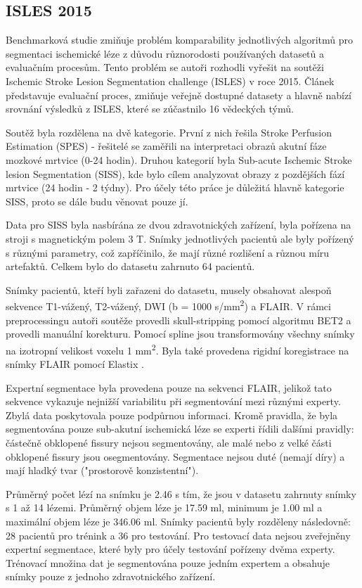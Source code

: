 \documentclass[11pt]{article}
\begin{document}
\subsection{ISLES 2015}
\label{lbl-isles15}
Benchmarková studie \cite{Maier2016} zmiňuje problém komparability jednotlivých algoritmů pro segmentaci ischemické léze z důvodu různorodosti používaných datasetů a evaluačním procesům. Tento problém se autoři rozhodli vyřešit na soutěži Ischemic Stroke Lesion Segmentation challenge (ISLES) v roce 2015. Článek představuje evaluační proces, zmiňuje veřejně dostupné datasety a hlavně nabízí srovnání výsledků z ISLES, které se zúčastnilo 16 vědeckých týmů.

Soutěž byla rozdělena na dvě kategorie. První z nich řešila Stroke Perfusion Estimation (SPES) - řešitelé se zaměřili na interpretaci obrazů akutní fáze mozkové mrtvice (0-24 hodin). Druhou kategorií byla Sub-acute Ischemic Stroke lesion Segmentation (SISS), kde bylo cílem analyzovat obrazy z pozdějších fází mrtvice (24 hodin - 2 týdny). Pro účely této práce je důležitá hlavně kategorie SISS, proto se dále budu věnovat pouze jí.

Data pro SISS byla nasbírána ze dvou zdravotnických zařízení, byla pořízena na stroji s magnetickým polem 3 T. Snímky jednotlivých pacientů ale byly pořízený s různými parametry, což zapříčinilo, že mají různé rozlišení a různou míru artefaktů. Celkem bylo do datasetu zahrnuto 64 pacientů.

Snímky pacientů, kteří byli zařazeni do datasetu, musely obsahovat alespoň sekvence T1-vážený, T2-vážený, DWI (b = 1000 s/mm\textsuperscript{2}) a FLAIR. V rámci preprocessingu autoři soutěže provedli skull-stripping pomocí algoritmu BET2 \cite{jenkinson2005bet2} a provedli manuální korekturu. Pomocí spline jsou transformovány všechny snímky na izotropní velikost voxelu 1 mm\textsuperscript{2}. Byla také provedena rigidní koregistrace na snímky FLAIR pomocí Elastix \cite{elastix}.

Expertní segmentace byla provedena pouze na sekvenci FLAIR, jelikož tato sekvence vykazuje nejnižší variabilitu při segmentování mezi různými experty. Zbylá data poskytovala pouze podpůrnou informaci. Kromě pravidla, že byla segmentována pouze sub-akutní ischemická léze se experti řídili dalšími pravidly: částečně obklopené fissury nejsou segmentovány, ale malé nebo z velké části obklopené fissury jsou osegmentovány. Segmentace nejsou duté (nemají díry) a mají hladký tvar ("prostorově konzistentní").

Průměrný počet lézí na snímku je 2.46 s tím, že jsou v datasetu zahrnuty snímky s 1 až 14 lézemi. Průměrný objem léze je 17.59 ml, minimum je 1.00 ml a maximální objem léze je 346.06 ml. Snímky pacientů byly rozděleny následovně: 28 pacientů pro trénink a 36 pro testování. Pro testovací data nejsou zveřejněny expertní segmentace, které byly pro účely testování pořízeny dvěma experty. Trénovací množina dat je segmentována pouze jedním expertem a obsahuje snímky pouze z jednoho zdravotnického zařízení.
\end{document}
